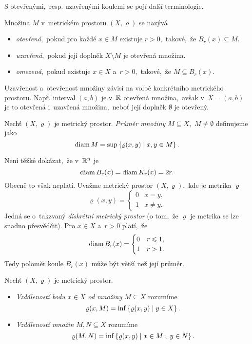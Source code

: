 S otevřenými,~resp. uzavřenými koulemi se pojí další terminologie.
\begin{definition}\label{def:otevrena-uzavrena-omezena-mnozina}
     Množina $M$ v~metrickém prostoru $(X,\varrho)$ se nazývá
     \begin{itemize}
        \item \emph{otevřená},~pokud pro každé $x\in M$ existuje $r>0$,~takové,~že $B_r(x)\subseteq M$.
        \item \emph{uzavřená},~pokud její doplněk $X\setminus M$ je otevřená množina.
        \item \emph{omezená},~pokud existuje $x\in X$ a~$r>0$,~takové,~že $M\subseteq B_r(x)$.
     \end{itemize}
\end{definition}
Uzavřenost a~otevřenost množiny závisí na volbě konkrétního metrického prostoru. Např. interval $(a,b)$ je v~$\mathbb{R}$ otevřená množina,~avšak v~$X=(a,b)$ je to otevřená i~uzavřená množina,~neboť její doplněk $\emptyset$ je otevřený.
\begin{definition}\label{def:prumer-mnoziny}
    Nechť $(X,\varrho)$ je metrický prostor. \emph{Průměr množiny $M\subseteq X$},~$M\neq\emptyset$ definujeme jako
    \[\operatorname{diam}{M}=\sup\left\{\varrho(x,y)\mid x,y\in M\right\}.\]
\end{definition}
Není těžké dokázat,~že v~$\mathbb{R}^n$ je
\[\operatorname{diam}{B_r(x)}=\operatorname{diam}{K_r(x)}=2r.\]
Obecně to však neplatí. Uvažme metrický prostor $(X,\varrho)$,~kde je metrika $\varrho$
\[\varrho(x,y)=\begin{cases}
    0 & x=y,\\
    1 & x\neq y.
\end{cases}\]
Jedná se o~takzvaný \emph{diskrétní metrický prostor} (o tom,~že $\varrho$ je metrika se lze snadno přesvědčit). Pro $x\in X$ a~$r>0$ platí,~že
\[\operatorname{diam}{B_r(x)}=\begin{cases}
    0 & r\leqslant 1,\\
    1 & r>1.
\end{cases}\]
Tedy poloměr koule $B_r(x)$ může být větší než její průměr.

\begin{definition}\label{def:vzdalenost-bodu-od-mnoziny-vzdalenost-mnozin}
    Nechť $(X,\varrho)$ je metrický prostor.
    \begin{itemize}
        \item {}\emph{Vzdáleností bodu $x\in X$ od množiny $M\subseteq X$} rozumíme
        \[\varrho(x,M)=\inf\left\{\varrho(x,y)\mid y\in X\right\}.\]
        \item {}\emph{Vzdáleností množin $M,N\subseteq X$} rozumíme
        \[\varrho(M,N)=\inf\left\{\varrho(x,y)\mid x\in M\;,\;y\in N\right\}.\]
    \end{itemize}
\end{definition}

